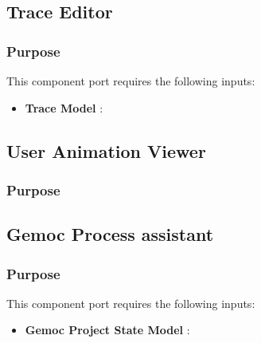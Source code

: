 \documentclass{gemoc} %
\begin{document}
\subsection{Trace Editor}


\subsubsection{Purpose}

This component port requires the following inputs:
\begin{itemize}
  \item \textbf{Trace Model} :
\end{itemize}


\subsection{User Animation Viewer}


\subsubsection{Purpose}



\subsection{Gemoc Process assistant}


\subsubsection{Purpose}

This component port requires the following inputs:
\begin{itemize}
  \item \textbf{Gemoc Project State Model} :
\end{itemize}
\end{document}
